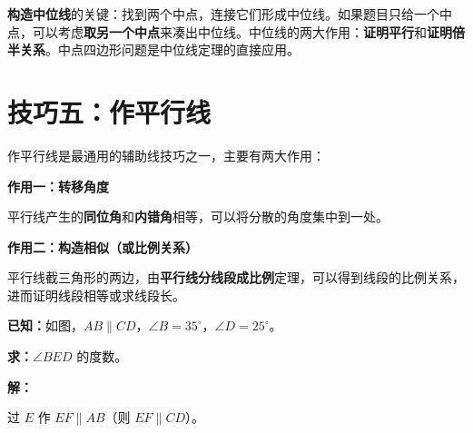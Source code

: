 \documentclass[12pt, a4paper]{ctexart}
\begin{document}
\begin{tipbox}[方法总结]
\textbf{构造中位线}的关键：找到两个中点，连接它们形成中位线。如果题目只给一个中点，可以考虑\textbf{取另一个中点}来凑出中位线。中位线的两大作用：\textbf{证明平行}和\textbf{证明倍半关系}。中点四边形问题是中位线定理的直接应用。
\end{tipbox}

\section*{\textcolor{mainblue}{技巧五：作平行线}}

\begin{knowledgebox}[作平行线的作用]
作平行线是最通用的辅助线技巧之一，主要有两大作用：

\medskip
\noindent\textbf{作用一：转移角度}

平行线产生的\textbf{同位角}和\textbf{内错角}相等，可以将分散的角度集中到一处。

\medskip
\noindent\textbf{作用二：构造相似（或比例关系）}

平行线截三角形的两边，由\textbf{平行线分线段成比例}定理，可以得到线段的比例关系，进而证明线段相等或求线段长。
\end{knowledgebox}

\begin{examplebox}
\textbf{已知：}如图，\(AB \parallel CD\)，\(\angle B = 35^\circ\)，\(\angle D = 25^\circ\)。

\textbf{求：}\(\angle BED\) 的度数。
\end{examplebox}

\noindent\textbf{解：}

过 \(E\) 作 \(EF \parallel AB\)（则 \(EF \parallel CD\)）。

\begin{center}
\end{center}
\end{document}
